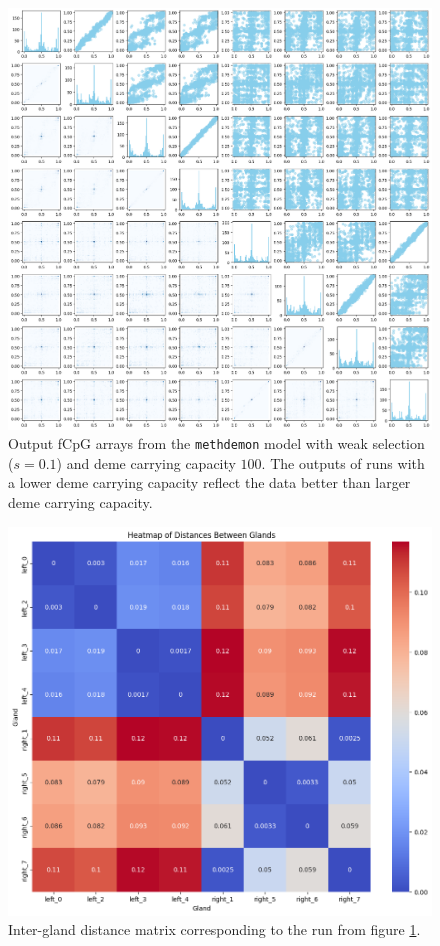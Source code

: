 \begin{figure}[h]
    \centering
    \includegraphics[width=\textwidth]{Chapter_5/figures/100plot.png}
    \caption{Output fCpG arrays from the \texttt{methdemon} model with weak
    selection ($s=0.1$) and deme carrying capacity $100$. The outputs of runs
    with a lower deme carrying capacity reflect the data better than larger
    deme carrying capacity.}
    \label{fig:methdemon_weak_selection_small}
\end{figure}

\begin{figure}[h]
    \centering
    \includegraphics[width=\textwidth]{Chapter_5/figures/100dist.png}
    \caption{Inter-gland distance matrix corresponding to the run from figure
    \ref{fig:methdemon_weak_selection_small}.}
    \label{fig:methdemon_weak_dist_small}
\end{figure}
\clearpage

